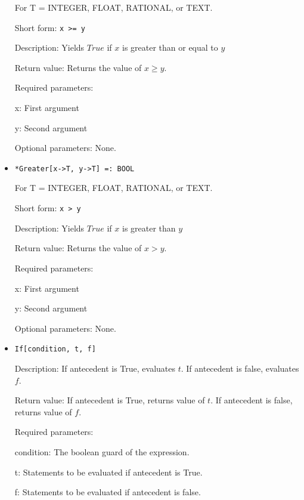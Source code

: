 \begin{itemize}
For T = INTEGER, FLOAT, RATIONAL, or TEXT.

\bd
\item
[Short form:] \verb+x >= y+
\item
[Description:] Yields $True$ if $x$ is greater than or equal to $y$
\item
[Return value:] Returns the value of $x \geq y$.
\item
[Required parameters:]\hfil\null

\bd
\item
[x:] First argument
\item
[y:] Second argument
\ed

\item
[Optional parameters:] None.
\ed

\item
\protect \large \begin{verbatim}
*Greater[x->T, y->T] =: BOOL
\end{verbatim}\normalsize

For T = INTEGER, FLOAT, RATIONAL, or TEXT.

\bd
\item
[Short form:] \verb+x > y+
\item
[Description:] Yields $True$ if $x$ is greater than $y$
\item
[Return value:] Returns the value of $x > y$.
\item
[Required parameters:]\hfil\null

\bd
\item
[x:] First argument
\item
[y:] Second argument
\ed
\item
[Optional parameters:] None.
\ed



\item 
\protect \large \begin{verbatim}
If[condition, t, f]
\end{verbatim} \normalsize
  
\bd
\item
[Description:] If antecedent is True, evaluates $t$.  If
antecedent is false, evaluates $f$. 
\item
[Return value:] If antecedent is True, returns value of $t$.  If
antecedent is false, returns value of $f$.  
\item
[Required parameters:]\hfil\null
\bd
\item
[condition:] The boolean guard of the expression.
\item
[t:] Statements to be evaluated if antecedent is True. 
\item
[f:] Statements to be evaluated if antecedent is false. 
\ed
\ed



\end{itemize}

